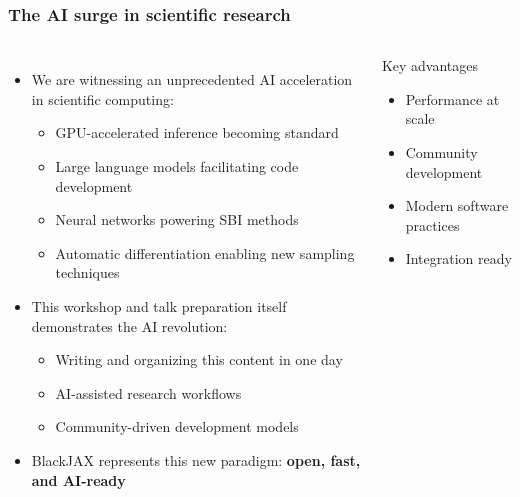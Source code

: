 \documentclass[aspectratio=169]{beamer}
\begin{document}
\begin{frame}
    \frametitle{The AI surge in scientific research}
    \begin{columns}
        \begin{itemize}
            \item We are witnessing an unprecedented AI acceleration in scientific computing:
                \begin{itemize}
                    \item GPU-accelerated inference becoming standard
                    \item Large language models facilitating code development
                    \item Neural networks powering SBI methods
                    \item Automatic differentiation enabling new sampling techniques
                \end{itemize}
            \item This workshop and talk preparation itself demonstrates the AI revolution:
                \begin{itemize}
                    \item Writing and organizing this content in one day
                    \item AI-assisted research workflows
                    \item Community-driven development models
                \end{itemize}
            \item BlackJAX represents this new paradigm: \textbf{open, fast, and AI-ready}
        \end{itemize}
        \begin{block}{Key advantages}
            \begin{itemize}
                \item Performance at scale
                \item Community development
                \item Modern software practices
                \item Integration ready
            \end{itemize}
        \end{block}
    \end{columns}
\end{frame}
\end{document}
